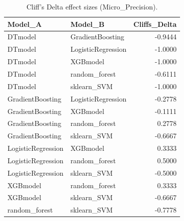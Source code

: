 \begin{table}[t]
\centering
\begin{tabular}{llr}
\toprule
Model_A & Model_B & Cliffs_Delta \\
\midrule
DTmodel & GradientBoosting & -0.9444 \\
DTmodel & LogisticRegression & -1.0000 \\
DTmodel & XGBmodel & -1.0000 \\
DTmodel & random_forest & -0.6111 \\
DTmodel & sklearn_SVM & -1.0000 \\
GradientBoosting & LogisticRegression & -0.2778 \\
GradientBoosting & XGBmodel & -0.1111 \\
GradientBoosting & random_forest & 0.2778 \\
GradientBoosting & sklearn_SVM & -0.6667 \\
LogisticRegression & XGBmodel & 0.3333 \\
LogisticRegression & random_forest & 0.5000 \\
LogisticRegression & sklearn_SVM & -0.5000 \\
XGBmodel & random_forest & 0.3333 \\
XGBmodel & sklearn_SVM & -0.6667 \\
random_forest & sklearn_SVM & -0.7778 \\
\bottomrule
\end{tabular}
\caption{Cliff's Delta effect sizes (Micro_Precision).}
\label{tab:cliffs_Micro_Precision}
\end{table}